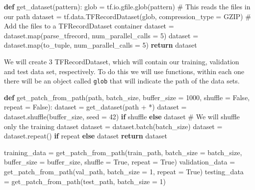 \documentclass[
  letterpaper,
  DIV=11,
  numbers=noendperiod]{scrreprt}
\newenvironment{Shaded}{\begin{snugshade}}{\end{snugshade}}
\newcommand{\BuiltInTok}[1]{\textcolor[rgb]{0.00,0.23,0.31}{#1}}
\newcommand{\CommentTok}[1]{\textcolor[rgb]{0.37,0.37,0.37}{#1}}
\newcommand{\ControlFlowTok}[1]{\textcolor[rgb]{0.00,0.23,0.31}{\textbf{#1}}}
\newcommand{\DecValTok}[1]{\textcolor[rgb]{0.68,0.00,0.00}{#1}}
\newcommand{\KeywordTok}[1]{\textcolor[rgb]{0.00,0.23,0.31}{\textbf{#1}}}
\newcommand{\NormalTok}[1]{\textcolor[rgb]{0.00,0.23,0.31}{#1}}
\newcommand{\OperatorTok}[1]{\textcolor[rgb]{0.37,0.37,0.37}{#1}}
\newcommand{\StringTok}[1]{\textcolor[rgb]{0.13,0.47,0.30}{#1}}
\newcommand{\VariableTok}[1]{\textcolor[rgb]{0.07,0.07,0.07}{#1}}
\begin{document}
\begin{Shaded}
\begin{Highlighting}[]
\KeywordTok{def}\NormalTok{ get\_dataset(pattern):}
\NormalTok{    glob }\OperatorTok{=}\NormalTok{ tf.io.gfile.glob(pattern) }\CommentTok{\# This reads the files in our path}
\NormalTok{    dataset }\OperatorTok{=}\NormalTok{ tf.data.TFRecordDataset(glob, compression\_type }\OperatorTok{=} \StringTok{\textquotesingle{}GZIP\textquotesingle{}}\NormalTok{) }\CommentTok{\# Add the files to a TFRecordDataset container}
\NormalTok{    dataset }\OperatorTok{=}\NormalTok{ dataset.}\BuiltInTok{map}\NormalTok{(parse\_tfrecord, num\_parallel\_calls }\OperatorTok{=} \DecValTok{5}\NormalTok{)}
\NormalTok{    dataset }\OperatorTok{=}\NormalTok{ dataset.}\BuiltInTok{map}\NormalTok{(to\_tuple, num\_parallel\_calls }\OperatorTok{=} \DecValTok{5}\NormalTok{)}
    \ControlFlowTok{return}\NormalTok{ dataset}
\end{Highlighting}
\end{Shaded}

We will create 3 TFRecordDataset, which will contain our training,
validation and test data set, respectively. To do this we will use
functions, within each one there will be an object called \texttt{glob}
that will indicate the path of the data sets.

\begin{Shaded}
\begin{Highlighting}[]
\KeywordTok{def}\NormalTok{ get\_patch\_from\_path(path, batch\_size, buffer\_size }\OperatorTok{=} \DecValTok{1000}\NormalTok{, shuffle }\OperatorTok{=} \VariableTok{False}\NormalTok{, repeat }\OperatorTok{=} \VariableTok{False}\NormalTok{):}
\NormalTok{    dataset }\OperatorTok{=}\NormalTok{ get\_dataset(path }\OperatorTok{+} \StringTok{\textquotesingle{}*\textquotesingle{}}\NormalTok{)}
\NormalTok{    dataset }\OperatorTok{=}\NormalTok{ dataset.shuffle(buffer\_size, seed }\OperatorTok{=} \DecValTok{42}\NormalTok{) }\ControlFlowTok{if}\NormalTok{ shuffle }\ControlFlowTok{else}\NormalTok{ dataset }\CommentTok{\# We will shuffle only the training dataset}
\NormalTok{    dataset }\OperatorTok{=}\NormalTok{ dataset.batch(batch\_size)}
\NormalTok{    dataset }\OperatorTok{=}\NormalTok{ dataset.repeat() }\ControlFlowTok{if}\NormalTok{ repeat }\ControlFlowTok{else}\NormalTok{ dataset}
    \ControlFlowTok{return}\NormalTok{ dataset}

\NormalTok{training\_data }\OperatorTok{=}\NormalTok{ get\_patch\_from\_path(train\_path, batch\_size }\OperatorTok{=}\NormalTok{ batch\_size, buffer\_size }\OperatorTok{=}\NormalTok{ buffer\_size, shuffle }\OperatorTok{=} \VariableTok{True}\NormalTok{, repeat }\OperatorTok{=} \VariableTok{True}\NormalTok{)}
\NormalTok{validation\_data }\OperatorTok{=}\NormalTok{ get\_patch\_from\_path(val\_path, batch\_size }\OperatorTok{=} \DecValTok{1}\NormalTok{, repeat }\OperatorTok{=} \VariableTok{True}\NormalTok{)}
\NormalTok{testing\_data }\OperatorTok{=}\NormalTok{ get\_patch\_from\_path(test\_path, batch\_size }\OperatorTok{=} \DecValTok{1}\NormalTok{)}
\end{Highlighting}
\end{Shaded}
\end{document}
